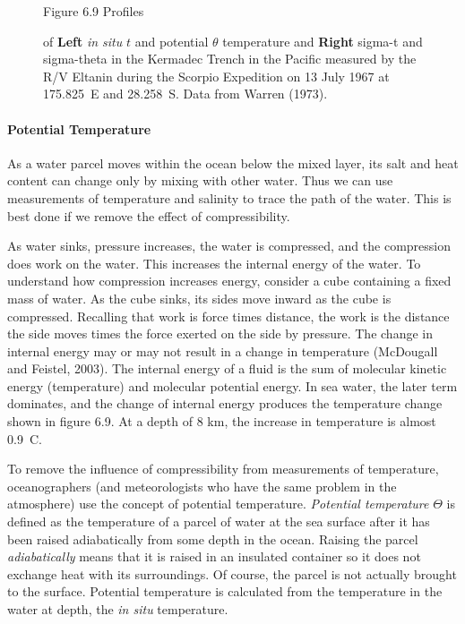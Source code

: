 \begin{figure}[t!]
\footnotesize
Figure 6.9 Profiles \rule{0mm}{4ex}of \textbf{Left} \textit{in
  situ} $t$ and potential $\theta$ temperature and
\textbf{Right} sigma-t and sigma-theta in the Kermadec Trench in the
Pacific measured by the R/V Eltanin during the Scorpio Expedition on
13 July 1967 at 175.825\degrees\ E and 28.258\degrees\ S. Data from
Warren (1973).

\label{fig:thetaprofile}
\vspace{-4ex}
\end{figure}

\paragraph{Potential Temperature}
As a water
parcel moves within the ocean below the mixed layer, its salt and heat content can change only by mixing with
other water. Thus we can use measurements of temperature and salinity
to trace the path of the water. This is best done if we remove the
effect of compressibility.

As water sinks, pressure increases, the water is compressed, and the
compression does work on the water. This increases the internal energy
of the water. To understand how compression increases energy, consider
a cube containing a fixed mass of water. As the cube sinks, its sides
move inward as the cube is compressed. Recalling that work is force
times distance, the work is the distance the side moves times the
force exerted on the side by pressure. The change in internal energy
may or may not result in a change in temperature (McDougall and
Feistel, 2003). The internal energy of a fluid is the sum of molecular
kinetic energy (temperature) and molecular potential energy. In sea
water, the later term dominates, and the change of internal energy
produces the temperature change shown in figure 6.9. At a depth of 8
km, the increase in temperature is almost 0.9\degrees\ C.

To remove the influence of compressibility from measurements of
temperature, oceanographers (and meteorologists who have the same
problem in the atmosphere) use the concept of potential
temperature. \textit{Potential
  temperature}
$\Theta$ is defined as the temperature of a parcel of water at the sea
surface after it has been raised adiabatically from some depth in the
ocean. Raising the parcel \textit{adiabatically}
means that it is raised in an insulated
container so it does not exchange heat with its surroundings. Of
course, the parcel is not actually brought to the surface. Potential
temperature is calculated from the temperature in the water at depth,
the \textit{in situ} temperature.

